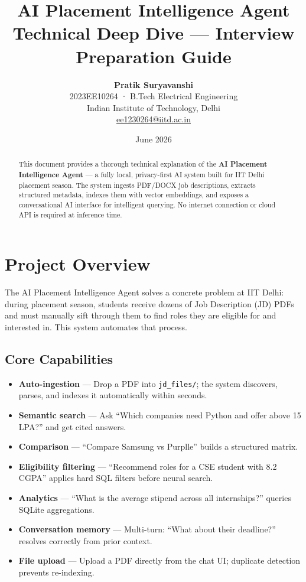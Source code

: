 \documentclass[12pt, a4paper]{article}
\title{
    \vspace{-1cm}
    {\Large\textbf{\textcolor{primary}{AI Placement Intelligence Agent}}}\\[0.3em]
    {\normalsize Technical Deep Dive --- Interview Preparation Guide}
}
\author{
    \textbf{Pratik Suryavanshi}\\
    2023EE10264 · B.Tech Electrical Engineering\\
    Indian Institute of Technology, Delhi\\
    \href{mailto:ee1230264@iitd.ac.in}{ee1230264@iitd.ac.in}
}
\date{June 2026}
\begin{document}

\maketitle
\thispagestyle{fancy}

\begin{abstract}
This document provides a thorough technical explanation of the \textbf{AI Placement Intelligence Agent} --- a fully local, privacy-first AI system built for IIT Delhi placement season. The system ingests PDF/DOCX job descriptions, extracts structured metadata, indexes them with vector embeddings, and exposes a conversational AI interface for intelligent querying. No internet connection or cloud API is required at inference time.
\end{abstract}

\tableofcontents
\newpage

\section{Project Overview}

The AI Placement Intelligence Agent solves a concrete problem at IIT Delhi: during placement season, students receive dozens of Job Description (JD) PDFs and must manually sift through them to find roles they are eligible for and interested in. This system automates that process.

\subsection{Core Capabilities}

\begin{itemize}[leftmargin=*, noitemsep]
    \item \textbf{Auto-ingestion} --- Drop a PDF into \texttt{jd\_files/}; the system discovers, parses, and indexes it automatically within seconds.
    \item \textbf{Semantic search} --- Ask ``Which companies need Python and offer above 15 LPA?'' and get cited answers.
    \item \textbf{Comparison} --- ``Compare Samsung vs Purplle'' builds a structured matrix.
    \item \textbf{Eligibility filtering} --- ``Recommend roles for a CSE student with 8.2 CGPA'' applies hard SQL filters before neural search.
    \item \textbf{Analytics} --- ``What is the average stipend across all internships?'' queries SQLite aggregations.
    \item \textbf{Conversation memory} --- Multi-turn: ``What about their deadline?'' resolves correctly from prior context.
    \item \textbf{File upload} --- Upload a PDF directly from the chat UI; duplicate detection prevents re-indexing.
\end{itemize}
\end{document}
